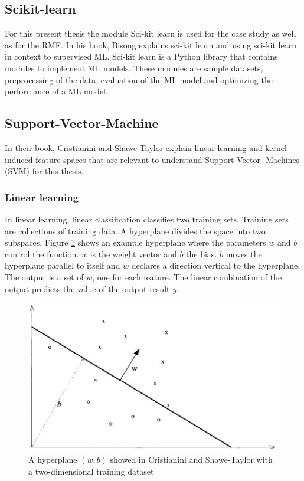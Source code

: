 \subsection{Scikit-learn}

For this present thesis the module Sci-kit learn is used for the case study as well as for the RMF. In his book, Bisong \cite{Bisong_2019} explains sci-kit learn and using sci-kit learn
in context to supervised ML. Sci-kit learn is a Python library that contains modules to implement ML models. These modules are sample datasets, preprocessing of the data, evaluation of
the ML model and optimizing the performance of a ML model.

\subsection{Support-Vector-Machine}

In their book, Cristianini and Shawe-Taylor \cite{cristianini_shawe-taylor_2000} explain linear learning and kernel-induced feature spaces that are relevant to understand Support-Vector-
Machines (SVM) for this thesis.

\subsubsection*{Linear learning}

In linear learning, linear classification classifies two training sets. Training sets are collections of training data. A hyperplane divides the space into two subspaces.
\cite{cristianini_shawe-taylor_2000} Figure \ref{fig:hyperplane} shows an example hyperplane where the parameters $w$ and $b$ control the function. $w$ is the weight vector and $b$ the
bias. $b$ moves the hyperplane parallel to itself and $w$ declares a direction vertical to the hyperplane. The output is a set of $w$, one for each feature. The linear combination of the
output predicts the value of the output result $y$.

\begin{figure}[ht!]
  \centering
  \includegraphics[width=12cm]{pictures/hyperplane.jpg}
  \caption{A hyperplane $(w, b)$ showed in Cristianini and Shawe-Taylor \cite{cristianini_shawe-taylor_2000} with a two-dimensional training dataset}
  \label{fig:hyperplane}
\end{figure}

